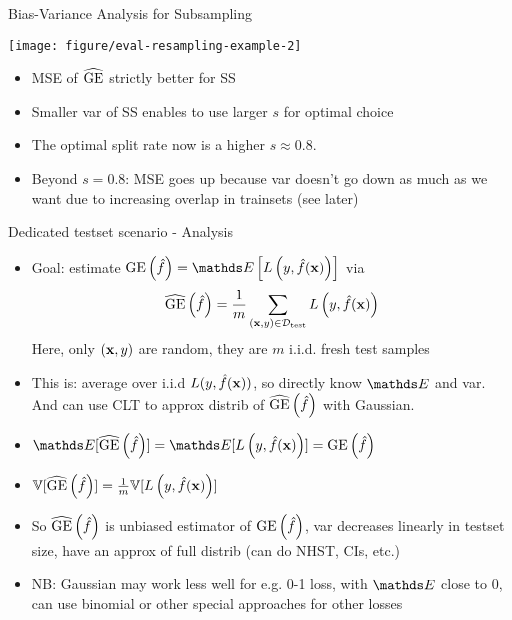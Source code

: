 \documentclass[11pt,compress,t,notes=noshow, xcolor=table]{beamer}
\begin{document}
\begin{vbframe}{Bias-Variance Analysis for Subsampling}

\begin{center}
\texttt{[image: figure/eval-resampling-example-2]}
\end{center}

\begin{itemize}
  \item MSE of $\widehat{\mathrm{GE}}$ strictly better for SS
  \item Smaller var of SS enables to use larger $s$ for optimal choice
  \item The optimal split rate now is a higher $s \approx 0.8$.
  \item Beyond $s=0.8$: MSE goes up because var doesn't go down as much as we want 
      due to increasing overlap in trainsets (see later)
\end{itemize}

\end{vbframe}





\begin{frame}{Dedicated testset scenario - Analysis}
\begin{itemize}
\item Goal: estimate $\GEf = \E \left[\Lyfhx \right]$ via
$$\widehat{\mathrm{GE}}\left(\hat{f}\right) = \frac{1}{m} \sum_{(\mathbf{x}, y) \in \mathcal{D}_{\text{test}}} L\left(y, \hat{f}(\mathbf{x})\right) $$
Here, only $(\mathbf{x},y)$ are random, they are $m$ i.i.d. fresh test samples


\item This is: average over i.i.d $L(y, \hat{f}(\mathbf{x}))$,
    so directly know $\E$ and var. And can use CLT to approx distrib of $\widehat{\mathrm{GE}}\left(\hat{f}\right)$ with Gaussian.

\item $\E[\GEfh] = \E[\Lyfhx] = \GEf $

\item $\mathbb{V}[\widehat{\mathrm{GE}}\left(\hat{f}\right)] = \frac{1}{m} \mathbb{V}[L\left(y, \hat{f}(\mathbf{x})\right)]$ 

\item So $\widehat{\mathrm{GE}}\left(\hat{f}\right)$ is unbiased estimator of $\mathrm{GE}\left(\hat{f}\right)$, var decreases linearly in testset size, have an approx of full distrib (can do NHST, CIs, etc.)
\item NB: Gaussian may work less well for e.g. 0-1 loss, with $\E$ close to 0, can use binomial or other special approaches for other losses

\end{itemize}
\end{frame}
\end{document}
